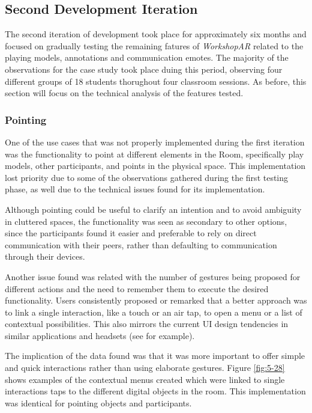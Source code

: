 \subsection{Second Development Iteration \label{sec:5-2-3}}

The second iteration of development took place for approximately six months and focused on gradually testing the remaining fatures of \emph{WorkshopAR} related to the playing models, annotations
and communication emotes. The majority of the observations for the case study took place duing this period, observing four different groups of 18 students thorughout four classroom sessions. As
before, this section will focus on the technical analysis of the features tested.

\subsubsection{Pointing \label{sec:5-2-3-1}}

One of the use cases that was not properly implemented during the first iteration was the functionality to point at different elements in the Room, specifically play models, other
participants, and points in the physical space. This implementation lost priority due to some of the observations gathered during the first testing phase, as well due to the technical
issues found for its implementation.

Although pointing could be useful to clarify an intention and to avoid ambiguity in cluttered spaces, the functionality was seen as secondary to other options, since the participants
found it easier and preferable to rely on direct communication with their peers, rather than defaulting to communication through their devices.

Another issue found was related with the number of gestures being proposed for different actions and the need to remember them to execute the desired functionality. Users consistently
proposed or remarked that a better approach was to link a single interaction, like a touch or an air tap, to open a menu or a list of contextual possibilities. This also mirrors the
current UI design tendencies in similar applications and headsets (see \textcite{arcore_2025,meta_horizon_2025} for example).

The implication of the data found was that it was more important to offer simple and quick interactions rather than using elaborate gestures. Figure \ref{fig:5-28} shows examples of the
contextual menus created which were linked to single interactions taps to the different digital objects in the room. This implementation was identical for pointing objects and participants.

